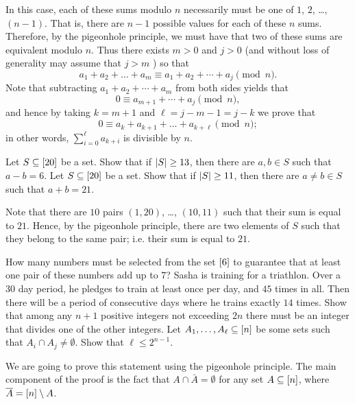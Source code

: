 \begin{chapterendexercises}
\begin{solution}
      In this case, each of these sums modulo $n$ necessarily must be one of
      $1$, $2$, \dots, $(n - 1)$. That is, there are $n - 1$ possible values for
      each of these $n$ sums. Therefore, by the pigeonhole principle, we must
      have that two of these sums are equivalent modulo $n$. Thus there exists
      $m > 0 $ and $j > 0$ (and without loss of generality may assume that $j >
      m$ ) so that 
      \[
        a_1 + a_2 + \dots + a_m \equiv a_1 + a_2 + \cdots + a_j \pmod{n}.
      \]
      Note that subtracting $ a_1 + a_2 + \cdots + a_m$ from both sides yields
      that 
      \[
        0 \equiv
        a_{m + 1} + \cdots + a_{j} \pmod{n},
      \]
      and hence by taking $k = m + 1$ and $\ell = j - m - 1 = j - k $ we prove that 
      \[
        0 \equiv a_k + a_{k + 1} + \dots + a_{k + \ell} \pmod{n};
      \] 
      in other words, $\sum\limits_{i = 0}^\ell a_{k + i}$ is divisible by $n$.
    \end{solution}
  \exercise[recommended] Let $S \subseteq {[{20}]}$ be a set. Show that if
    $\left|{S}\right| \ge 13$, then there are $a, b \in S$ such that $a - b = 6$.
  \exercise Let $S \subseteq {[{20}]}$ be a set. Show that if $\left|{S}\right|
    \ge 11$, then there are $a \neq b \in S$ such that $a + b = 21$.
    \begin{solution}
      Note that there are $10$ pairs $(1, 20)$, \dots, $(10, 11)$ such that their
      sum is equal to $21$. Hence, by the pigeonhole principle, there are two
      elements of $S$ such that they belong to the same pair; i.e. their sum is
      equal to $21$.
    \end{solution}
  \exercise How many numbers must be selected from the set ${[{6}]}$ to
    guarantee that at least one pair of these numbers add up to $7$?
  \exercise Sasha is training for a triathlon. Over a $30$ day period, he
    pledges to train at least once per day, and $45$ times in all. Then there
    will be a period of consecutive days where he trains exactly $14$ times.
  \exercise Show that among any $n + 1$ positive integers not exceeding $2n$
    there must be an integer that divides one of the other integers.
  \exercise Let $A_1, \dots, A_\ell \subseteq {[{n}]}$ be some sets such that
    $A_i \cap A_j \neq \emptyset$. Show that $\ell \le 2^{n - 1}$.
    \begin{solution}
      We are going to prove this statement using the pigeonhole principle. The
      main component of the proof is the fact that $A \cap \bar{A} = \emptyset$
      for any set $A \subseteq {[{n}]}$, where $\overline{A} = {[{n}]} \setminus A$.


\end{solution}
\end{chapterendexercises}
